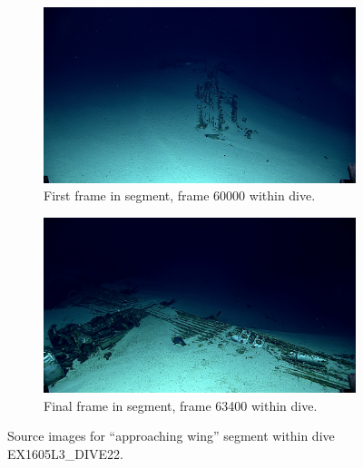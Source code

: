\documentclass[letterpaper,12pt]{article}
\begin{document}
\begin{figure}
    \centering
    \begin{subfigure}[b]{0.48\textwidth}
        \includegraphics[width=\textwidth]{images/image_060000.png}
        \caption{First frame in segment, frame 60000 within dive.}
        \label{fig:ex1605l3_dive22_approaching_wing_begin}
    \end{subfigure}
    \begin{subfigure}[b]{0.48\textwidth}
        \includegraphics[width=\textwidth]{images/image_063400.png}
        \caption{Final frame in segment, frame 63400 within dive.}
        \label{fig:ex1605l3_dive22_approaching_wing_end}
    \end{subfigure}
    \caption{Source images for ``approaching wing'' segment within dive EX1605L3\_DIVE22.}
\end{figure}
\end{document}
